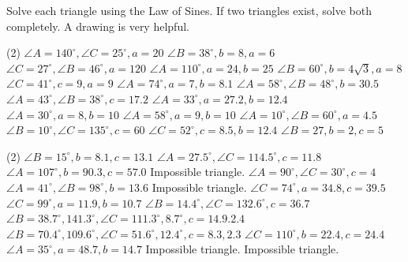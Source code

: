 \documentclass[12pt,fleqn]{book}
\newcommand{\sol}[1]{\begin{Answer}\parbox[t]{\textwidth-5em}{#1}\end{Answer}}
\begin{document}
\begin{Exercise}
	Solve each triangle using the Law of Sines. If two triangles exist, solve both completely. A drawing is very helpful.
	\begin{tasks}(2)
		\task $\angle A=140^{\circ}, \angle C=25^{\circ}, a=20$
		\vspace{14em}
		\task $\angle B=38^{\circ}, b=8, a=6$
		\vspace{14em}
		\task $\angle C=27^{\circ}, \angle B=46^{\circ}, a=120$
		\vspace{14em}
		\task $\angle A=110^{\circ}, a=24, b=25$
		\vspace{14em}
		\task $\angle B=60^{\circ}, b=4 \sqrt{3}, a=8$
		\vspace{14em}
		\task $\angle C=41^{\circ}, c=9, a=9$
		\vspace{14em}
		\task $\angle A=74^{\circ}, a=7, b=8.1$
		\vspace{14em}
		\task $\angle A=58^{\circ}, \angle B=48^{\circ}, b=30.5$
		\vspace{14em}
		\task $\angle A=43^{\circ}, \angle B=38^{\circ}, c=17.2$
		\vspace{14em}
		\task $\angle A=33^{\circ}, a=27.2, b=12.4$
		\vspace{14em}
		\task $\angle A=30^{\circ}, a=8, b=10$
		\vspace{14em}
		\task $\angle A=58^{\circ}, a=9, b=10$
		\vspace{14em}
		\task $\angle A=10^{\circ}, \angle B=60^{\circ}, a=4.5$
		\vspace{14em}
		\task $\angle B=10^{\circ}, \angle C=135^{\circ}, c=60$
		\vspace{14em}
		\task $\angle C=52^{\circ}, c=8.5, b=12.4$
		\vspace{14em}
		\task $\angle B=27, b=2, c=5$
		\vspace{14em}
	\end{tasks}
\end{Exercise}
\sol{
	\begin{tasks}(2)
		\task $\angle B=15^{\circ}, b=8.1, c=13.1$
		\task $\angle A=27.5^{\circ}, \angle C=114.5^{\circ}, c=11.8$
		\task $\angle A=107^{\circ}, b=90.3, c=57.0$
		\task Impossible triangle.
		\task $\angle A=90^{\circ}, \angle C=30^{\circ}, c=4$
		\task $\angle A=41^{\circ}, \angle B=98^{\circ}, b=13.6$
		\task Impossible triangle.
		\task $\angle C=74^{\circ}, a=34.8, c=39.5$
		\task $\angle C=99^{\circ}, a=11.9, b=10.7$ 
		\task $\angle B=14.4^{\circ}, \angle C=132.6^{\circ}, c=36.7$
		\task* $\angle B=38.7^{\circ}, 141.3^{\circ}, \angle C=111.3^{\circ}, 8.7^{\circ}, c=14.9 .2 .4$
		\task* $\angle B=70.4^{\circ}, 109.6^{\circ}, \angle C=51.6^{\circ}, 12.4^{\circ}, c=8.3,2.3$
		\task $\angle C=110^{\circ}, b=22.4, c=24.4$
		\task $\angle A=35^{\circ}, a=48.7, b=14.7$
		\task Impossible triangle.
		\task Impossible triangle.
	\end{tasks}
}
\end{document}
